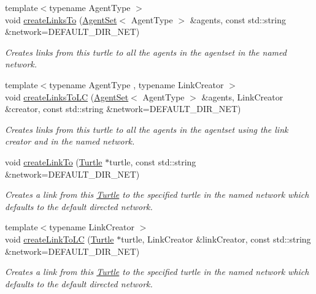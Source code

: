 \begin{DoxyCompactItemize}
{\footnotesize template$<$typename Agent\-Type $>$ }\\void \hyperlink{classrepast_1_1relogo_1_1_turtle_a36b942eeadab4d72eb7581897b7212eb}{create\-Links\-To} (\hyperlink{classrepast_1_1relogo_1_1_agent_set}{Agent\-Set}$<$ Agent\-Type $>$ \&agents, const std\-::string \&network=D\-E\-F\-A\-U\-L\-T\-\_\-\-D\-I\-R\-\_\-\-N\-E\-T)
\begin{DoxyCompactList}\small\item\em Creates links from this turtle to all the agents in the agentset in the named network. \end{DoxyCompactList}\item 
{\footnotesize template$<$typename Agent\-Type , typename Link\-Creator $>$ }\\void \hyperlink{classrepast_1_1relogo_1_1_turtle_a9dbed548c856425530de3164dc35c4ce}{create\-Links\-To\-L\-C} (\hyperlink{classrepast_1_1relogo_1_1_agent_set}{Agent\-Set}$<$ Agent\-Type $>$ \&agents, Link\-Creator \&creator, const std\-::string \&network=D\-E\-F\-A\-U\-L\-T\-\_\-\-D\-I\-R\-\_\-\-N\-E\-T)
\begin{DoxyCompactList}\small\item\em Creates links from this turtle to all the agents in the agentset using the link creator and in the named network. \end{DoxyCompactList}\item 
void \hyperlink{classrepast_1_1relogo_1_1_turtle_a85c8d02bd7b0f860334583e262d8fbd2}{create\-Link\-To} (\hyperlink{classrepast_1_1relogo_1_1_turtle}{Turtle} $\ast$turtle, const std\-::string \&network=D\-E\-F\-A\-U\-L\-T\-\_\-\-D\-I\-R\-\_\-\-N\-E\-T)
\begin{DoxyCompactList}\small\item\em Creates a link from this \hyperlink{classrepast_1_1relogo_1_1_turtle}{Turtle} to the specified turtle in the named network which defaults to the default directed network. \end{DoxyCompactList}\item 
{\footnotesize template$<$typename Link\-Creator $>$ }\\void \hyperlink{classrepast_1_1relogo_1_1_turtle_af674e400326eb0b7df57130c21bea403}{create\-Link\-To\-L\-C} (\hyperlink{classrepast_1_1relogo_1_1_turtle}{Turtle} $\ast$turtle, Link\-Creator \&link\-Creator, const std\-::string \&network=D\-E\-F\-A\-U\-L\-T\-\_\-\-D\-I\-R\-\_\-\-N\-E\-T)
\begin{DoxyCompactList}\small\item\em Creates a link from this \hyperlink{classrepast_1_1relogo_1_1_turtle}{Turtle} to the specified turtle in the named network which defaults to the default directed network. \end{DoxyCompactList}\item 

\end{DoxyCompactItemize}
